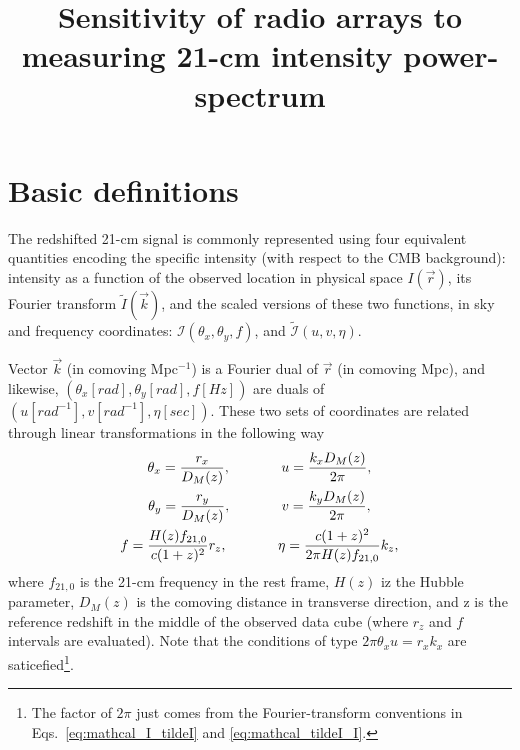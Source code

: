 \documentclass[12pt]{paper}
\title{Sensitivity of radio arrays to measuring 21-cm intensity power-spectrum}
\begin{document}
\maketitle

\section{Basic definitions}

The redshifted 21-cm signal is commonly represented using four equivalent quantities encoding the specific intensity (with respect to the CMB background): intensity as a function of the observed location in physical space $I(\vec{r})$, its Fourier transform $\widetilde{I}(\vec{k})$, and the scaled versions of these two functions, in sky and frequency coordinates: $\mathcal{I}(\theta_x, \theta_y, f)$, and $\widetilde{\mathcal{I}}(u,v,\eta)$.

Vector $\vec{k}$ (in comoving Mpc$^{-1}$) is a Fourier dual of $\vec{r}$ (in comoving Mpc), and likewise, $(\theta_x[rad], \theta_y[rad], f[Hz])$ are duals of $(u[rad^{-1}], v[rad^{-1}], \eta[sec])$. These two sets of coordinates are related through linear transformations in the following way
\begin{equation}
\begin{gathered}
\theta_x = \frac{r_x}{D_M(z)}, \hspace{0.5in} u = \frac{k_xD_M(z)}{2\pi},\\
\theta_y = \frac{r_y}{D_M(z)}, \hspace{0.5in} v = \frac{k_yD_M(z)}{2\pi},\\
f = \frac{H(z)f_{21,0}}{c(1+z)^2} r_z, \hspace{0.5in} \eta = \frac{c(1+z)^2}{2\pi H(z)f_{21,0}}k_z,
\end{gathered}
\label{eq:fourier_duals}
\end{equation}
where $f_{21,0}$ is the 21-cm frequency in the rest frame, $H(z)$ iz the Hubble parameter, $D_M(z)$ is the comoving distance in transverse direction, and z is the reference redshift in the middle of the observed data cube (where $r_z$ and $f$ intervals are evaluated). Note that the conditions of type $2\pi\theta_xu = r_xk_x$ are saticefied\footnote{The factor of $2\pi$ just comes from the Fourier-transform conventions in Eqs.~\ref{eq:mathcal_I_tildeI} and \ref{eq:mathcal_tildeI_I}.}.
\end{document}
